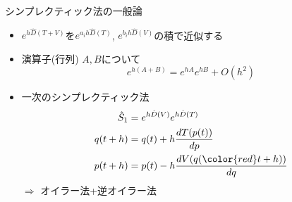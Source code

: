 \begin{frame}[t,fragile]{シンプレクティック法の一般論}
  \begin{itemize}
  \item $e^{h\hat{D}(T+V)}$を$e^{a_i h\hat{D}(T)}$, $e^{b_i h\hat{D}(V)}$の積で近似する
  \item 演算子(行列) $A,B$について
    \[
    e^{h (A+B)} = e^{hA} e^{hB} + O(h^2)
    \]
  \item 一次のシンプレクティック法
    \begin{align*}
      \hat{S}_1 &= e^{h\hat{D}(V)} e^{h\hat{D}(T)} \\
      q(t+h) &= q(t) + h \frac{dT(p(t))}{dp} \\
      p(t+h) &= p(t) - h \frac{dV(q({\color{red}t+h}))}{dq}
    \end{align*}
    $\Rightarrow$ オイラー法+逆オイラー法
  \end{itemize}
\end{frame}

